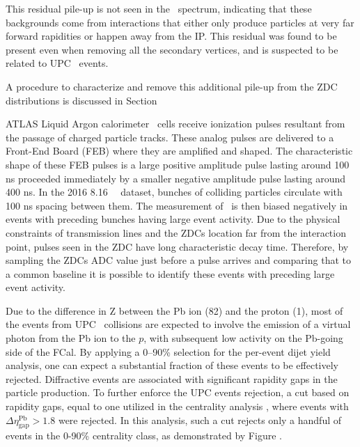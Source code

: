 This residual pile-up is not seen in the \ETPB\ spectrum, indicating that these backgrounds come from interactions that either only produce particles at very far forward rapidities or happen away from the IP.
This residual was found to be present even when removing all the secondary vertices, and is suspected to be related to UPC \pxPb\ events.

A procedure to characterize and remove this additional pile-up from the ZDC distributions is discussed in Section

ATLAS Liquid Argon calorimeter~\cite{ATLAS-TDR-02}  cells receive ionization pulses resultant from the passage of charged particle tracks. These analog pulses are delivered to a Front-End Board (FEB) where they are amplified and shaped.  The characteristic shape of these FEB pulses is a large positive amplitude pulse lasting around 100 ns proceeded immediately by a smaller negative amplitude pulse lasting around 400 ns.  In the 2016 8.16 \TeV\ \pxPb\ dataset, bunches of colliding particles circulate with 100 ns spacing between them. The measurement of \ETPB\ is then biased negatively in events with preceding bunches having large event activity. Due to the physical constraints of transmission lines and the ZDCs location far from the interaction point, pulses seen in the ZDC have long characteristic decay time.  Therefore, by sampling the ZDCs ADC value just before a pulse arrives and comparing that to a common baseline it is possible to identify these events with preceding large event activity.

Due to the difference in Z between the Pb ion (82) and the proton (1), most of the events from UPC \pxPb\ collisions are expected to involve the emission of a virtual photon from the Pb ion to the $p$, with subsequent low activity on the Pb-going side of the FCal. By applying a 0--90\% selection for the per-event dijet yield analysis, one can expect a substantial fraction of these events to be effectively rejected.  Diffractive events are associated with significant rapidity gaps in the particle production. To further enforce the UPC events rejection, a cut based on rapidity gaps, equal to one utilized in the centrality analysis \cite{Hill:2301540}, where events with $\Delta \eta_\mathrm{gap}^\mathrm{Pb} > 1.8$ were rejected.  In this analysis, such a cut rejects only a handful of events in the 0-90\% centrality class, as demonstrated by Figure
.

